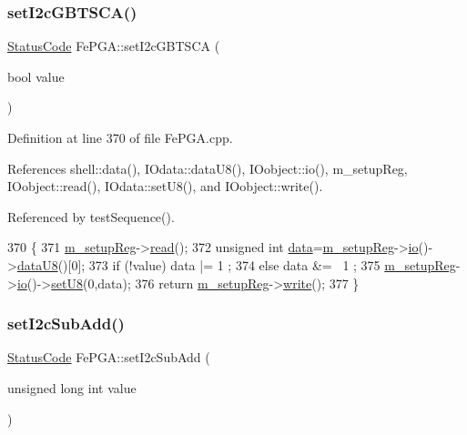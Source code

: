 \subsubsection{\texorpdfstring{set\+I2c\+G\+B\+T\+S\+C\+A()}{setI2cGBTSCA()}}
{\footnotesize\ttfamily \hyperlink{classStatusCode}{Status\+Code} Fe\+P\+G\+A\+::set\+I2c\+G\+B\+T\+S\+CA (\begin{DoxyParamCaption}\item[{bool}]{value }\end{DoxyParamCaption})}



Definition at line 370 of file Fe\+P\+G\+A.\+cpp.



References shell\+::data(), I\+Odata\+::data\+U8(), I\+Oobject\+::io(), m\+\_\+setup\+Reg, I\+Oobject\+::read(), I\+Odata\+::set\+U8(), and I\+Oobject\+::write().



Referenced by test\+Sequence().


\begin{DoxyCode}
370                                           \{
371   \hyperlink{classFePGA_a0255fe229013986b4387c3a75ddf4e97}{m\_setupReg}->\hyperlink{classIOobject_aa07610c11963b1db6710e3c76ceea456}{read}();
372   \textcolor{keywordtype}{unsigned} \textcolor{keywordtype}{int} \hyperlink{namespaceshell_a5ea2525995cedc3efd69ea8a7f034d1e}{data}=\hyperlink{classFePGA_a0255fe229013986b4387c3a75ddf4e97}{m\_setupReg}->\hyperlink{classIOobject_af04fb94137c3d86849f478ac5afab5d1}{io}()->\hyperlink{classIOdata_a75e9c318dbac3a39402179070943d4bc}{dataU8}()[0];
373   \textcolor{keywordflow}{if} (!value) data |= 1  ;
374   \textcolor{keywordflow}{else}        data &= ~1 ;
375   \hyperlink{classFePGA_a0255fe229013986b4387c3a75ddf4e97}{m\_setupReg}->\hyperlink{classIOobject_af04fb94137c3d86849f478ac5afab5d1}{io}()->\hyperlink{classIOdata_a6c4fb2f2af01889ada889c2b7aceb24d}{setU8}(0,data);
376   \textcolor{keywordflow}{return} \hyperlink{classFePGA_a0255fe229013986b4387c3a75ddf4e97}{m\_setupReg}->\hyperlink{classIOobject_a9f6984bc9f0fadcf800f1be2523ac744}{write}();
377 \}
\end{DoxyCode}
\mbox{\label{classFePGA_a37c1ee5bf89667c641f321479697166f}} 
\subsubsection{\texorpdfstring{set\+I2c\+Sub\+Add()}{setI2cSubAdd()}}
{\footnotesize\ttfamily \hyperlink{classStatusCode}{Status\+Code} Fe\+P\+G\+A\+::set\+I2c\+Sub\+Add (\begin{DoxyParamCaption}\item[{unsigned long int}]{value }\end{DoxyParamCaption})}



